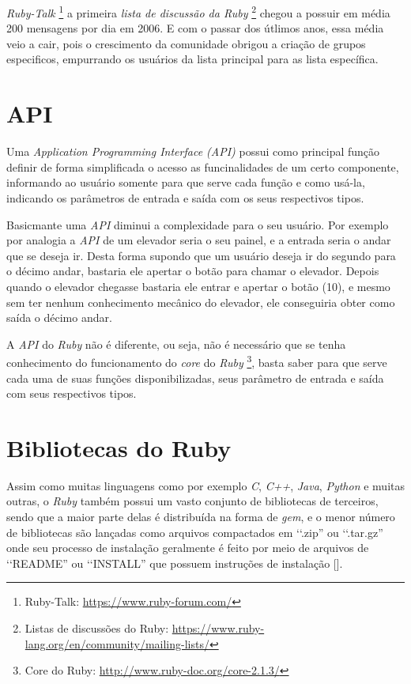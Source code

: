 \emph{Ruby-Talk} \footnote{Ruby-Talk: \url{https://www.ruby-forum.com/}} a primeira \emph{lista de
discussão da Ruby} \footnote{Listas de discussões do Ruby:
\url{https://www.ruby-lang.org/en/community/mailing-lists/}} chegou a possuir em média 200 mensagens por dia
em 2006. E com o passar dos útlimos anos, essa média veio a cair, pois o crescimento da comunidade
obrigou a criação de grupos especificos, empurrando os usuários da lista principal para as lista específica.


\section{API}
\label{API}

Uma \emph{Application Programming Interface (API)} possui como principal função definir de forma simplificada
o acesso as funcinalidades de um certo componente, informando ao usuário somente para que serve cada função
e como usá-la, indicando os parâmetros de entrada e saída com os seus respectivos tipos.

Basicmante uma \emph{API} diminui a complexidade para o seu usuário. Por exemplo por analogia a \emph{API}
de um elevador seria o seu painel, e a entrada seria o andar que se deseja ir. Desta forma supondo que
um usuário deseja ir do segundo para o décimo andar, bastaria ele apertar o botão para chamar o
elevador. Depois quando o elevador chegasse bastaria ele entrar e apertar o botão (10), e mesmo sem ter
nenhum conhecimento mecânico do elevador, ele conseguiria obter como saída o décimo andar.

A \emph{API} do \emph{Ruby} não é diferente, ou seja, não é necessário que se tenha
conhecimento do funcionamento do \emph{core} do \emph{Ruby}
\footnote{ Core do Ruby: \url{http://www.ruby-doc.org/core-2.1.3/}}, basta saber para que
serve cada uma de suas funções disponibilizadas, seus parâmetro de entrada e saída com seus respectivos tipos.

\section{Bibliotecas do Ruby}
\label{bibliotecas_do_ruby}

Assim como muitas linguagens como por exemplo \emph{C}, \emph{C++}, \emph{Java}, \emph{Python} e muitas
outras, o \emph{Ruby} também possui um vasto conjunto de bibliotecas de terceiros, sendo que a maior parte
delas é distribuída na forma de \emph{gem}, e o menor número de bibliotecas são lançadas como arquivos
compactados em ‘‘.zip'' ou ‘‘.tar.gz'' onde seu processo de instalação geralmente é feito por meio de
arquivos de ‘‘README'' ou ‘‘INSTALL'' que possuem instruções de instalação [].


